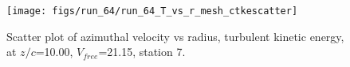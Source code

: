 \begin{figure}[H]
\centering
\texttt{[image: figs/run\_64/run\_64\_T\_vs\_r\_mesh\_ctkescatter]}
\caption{Scatter plot of azimuthal velocity vs radius, turbulent kinetic energy, at $z/c$=10.00, $V_{free}$=21.15, station 7.}
\label{fig:run_64_T_vs_r_mesh_ctkescatter}
\end{figure}


